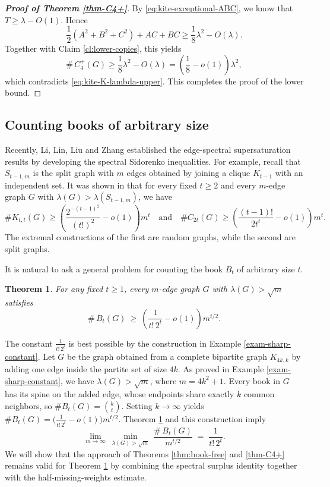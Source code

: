 \documentclass[10pt,a4paper]{amsart}
\newtheorem{theorem}{Theorem}[section]
\renewcommand{\ge}{\geqslant}
\begin{document}
\begin{proof}[{\bf Proof of Theorem \ref{thm-C4+}}]
By \eqref{eq:kite-exceptional-ABC}, we know that \(T\ge\lambda-O(1)\).  Hence
\[
        \frac12(A^2+B^2+C^2)+AC+BC
        \ge
        \frac18\lambda^2-O(\lambda).
\]
Together with Claim \ref{cl:lower-copies}, this yields
\[
      \texttt{\#} \,C_4^+(G)  \ge \frac18\lambda^2-O(\lambda)
        =
        \left(\frac18-o(1)\right)\lambda^2, 
\]
which contradicts \eqref{eq:kite-K-lambda-upper}. This completes the proof of the lower
bound. 
\end{proof}




\subsection{Counting books of arbitrary size} 

\label{sec:large-books}

Recently, 
Li, Lin, Liu and Zhang \cite{LLLZ2026} established the edge-spectral 
supersaturation results by developing the spectral Sidorenko inequalities. For example, recall that $S_{t-1,m}$ is the split graph with $m$ edges obtained by joining a clique $K_{t-1}$ with an independent set. It was shown in \cite{LLLZ2026} that for every fixed $t\ge 2$ and every $m$-edge graph $G$ with $\lambda(G)>\lambda(S_{t-1,m})$, we have 
$$\texttt{\#} K_{t,t}(G)
        \ge
        \left(\frac{2^{-(t-1)^2}}{(t!)^2}-o(1)\right)m^t \quad \text{and}\quad
 \texttt{\#}C_{2t}(G)
        \ge
        \left(\frac{(t-1)!}{2t^t}-o(1)\right)m^t.$$
The extremal constructions of the first are random graphs, while the second are split graphs. 

It is natural to ask a general problem for counting the book $B_t$ of arbitrary size $t$. 


\begin{theorem}\label{thm:Bt-count}
For any fixed $t\ge 1$, 
every $m$-edge graph $G$ with 
$\lambda(G)>\sqrt m$ satisfies
\[
   \texttt{\#}\,B_t(G)\ \ge\ \left(\frac{1}{t!\,2^{t}}-o(1)\right)m^{t/2}. 
\]
\end{theorem}

The constant $\tfrac{1}{t!\,2^{t}}$ is best possible by the construction in Example \ref{exam-sharp-constant}. Let $G$ be the graph obtained from a complete bipartite graph $K_{4k,k}$ by adding one edge inside the partite set of size $4k$. As proved in Example \ref{exam-sharp-constant}, we have $\lambda (G)> \sqrt{m}$, where $m=4k^2+1$. 
Every book in $G$ has its spine on the added edge, whose endpoints share exactly $k$ common neighbors, so $\texttt{\#}B_t(G)=\binom{k}{t}$. Setting $k\to \infty$  yields $\texttt{\#} B_t(G)=\bigl(\tfrac{1}{t!\,2^{t}}-o(1)\bigr)m^{t/2}$. 
 Theorem \ref{thm:Bt-count} and this construction  imply  
\[
   \lim_{m\to\infty}\ \min_{\lambda(G)>\sqrt m}\
   \frac{\texttt{\#}\,B_t(G)}{m^{t/2}}\;=\;\frac{1}{t!\,2^{t}} .
\]
 We will show that the approach of Theorems \ref{thm:book-free} and \ref{thm-C4+} remains valid  for Theorem \ref{thm:Bt-count} by combining the spectral surplus identity together with the half-missing-weights estimate. 
\end{document}
